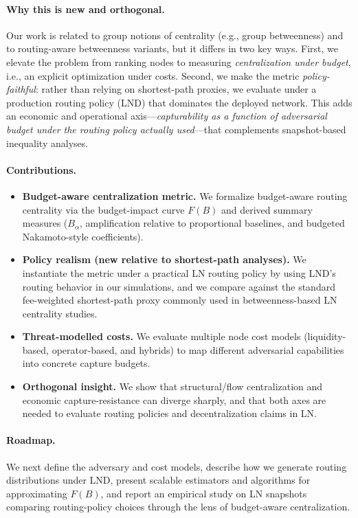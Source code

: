 \documentclass{article}
\begin{document}
\paragraph{Why this is new and orthogonal.}
Our work is related to group notions of centrality (e.g., group betweenness) and to routing-aware betweenness variants, but it differs in two key ways. First, we elevate the problem from ranking nodes to measuring \emph{centralization under budget}, i.e., an explicit optimization under costs. Second, we make the metric \emph{policy-faithful}: rather than relying on shortest-path proxies, we evaluate under a production routing policy (LND) that dominates the deployed network. This adds an economic and operational axis---\emph{capturability as a function of adversarial budget under the routing policy actually used}---that complements snapshot-based inequality analyses.

\paragraph{Contributions.}
\begin{itemize}
  \item \textbf{Budget-aware centralization metric.} We formalize budget-aware routing centrality via the budget-impact curve $F(B)$ and derived summary measures ($B_\alpha$, amplification relative to proportional baselines, and budgeted Nakamoto-style coefficients).
  \item \textbf{Policy realism (new relative to shortest-path analyses).} We instantiate the metric under a practical LN routing policy by using LND's routing behavior in our simulations, and we compare against the standard fee-weighted shortest-path proxy commonly used in betweenness-based LN centrality studies.
  \item \textbf{Threat-modelled costs.} We evaluate multiple node cost models (liquidity-based, operator-based, and hybrids) to map different adversarial capabilities into concrete capture budgets.
  \item \textbf{Orthogonal insight.} We show that structural/flow centralization and economic capture-resistance can diverge sharply, and that both axes are needed to evaluate routing policies and decentralization claims in LN.
\end{itemize}

\paragraph{Roadmap.}
We next define the adversary and cost models, describe how we generate routing distributions under LND, present scalable estimators and algorithms for approximating $F(B)$, and report an empirical study on LN snapshots comparing routing-policy choices through the lens of budget-aware centralization.
\end{document}
